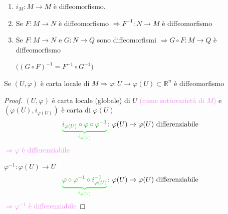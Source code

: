         \begin{osservazione}
        \mbox{}

        \begin{enumerate}
            \item $i_M \colon M \to M$ è diffeomorfismo.
            \item Se $F \colon M \to N$ è diffeomorfismo $\Rightarrow F^{-1} \colon N \to M$ è diffeomorfismo
            \item Se $F \colon M \to N$ e $G \colon N \to Q$ sono diffeomorfismi $\Rightarrow G \circ F \colon M \to Q$ è diffeomorfismo 
            
            $\bigl((G \circ F)^{-1} = F^{-1} \circ G^{-1}\bigr)$
        \end{enumerate} 
        \end{osservazione}
        \begin{proposizione}
        Se $(U, \varphi)$ è carta locale di $M \Rightarrow \varphi \colon U \to \varphi(U) \subset \mathbb{R}^n$ è diffeomorfismo
        \end{proposizione}
        \begin{proof}
        \mbox{}
        
        $(U, \varphi)$ è carta locale \textcolor{blu}{(globale)} di $U$ \textcolor{violet}{(come sottovarietà di $M$)} e $(\varphi(U), i_{\varphi(U)})$ è carta di $\varphi(U)$
        \[ \textcolor{green}{\underbrace{\textcolor{verde}{i_{\varphi(U)} \circ \varphi \circ \varphi^{-1}}}_{i_{\varphi(U)}}} \colon \varphi(U) \to \varphi(U) \text{ differenziabile} \]
        \textcolor{violet}{$\Rightarrow \varphi$ è differenziabile}

        $\varphi^{-1} \colon \varphi(U) \to U$
        \[ \textcolor{green}{\underbrace{\textcolor{verde}{\varphi \circ \varphi^{-1} \circ i_{\varphi(U)}^{-1}}}_{i_{\varphi(U)}}} \colon \varphi(U) \to \varphi(U) \text{ differenziabile} \]
        \textcolor{violet}{$\Rightarrow \varphi^{-1}$ è differenziabile}
        \end{proof}
        
